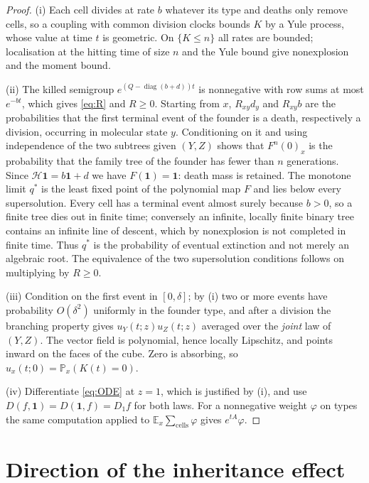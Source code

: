\documentclass[11pt]{article}
\theoremstyle{remark}
\newcommand{\one}{\mathbf 1}
\newcommand{\E}{\mathbb E}
\newcommand{\PP}{\mathbb P}
\newcommand{\diag}{\operatorname{diag}}
\newcommand{\Hm}{\mathcal H}
\begin{document}
\begin{proof}
(i) Each cell divides at rate $b$ whatever its type and deaths only remove
cells, so a coupling with common division clocks bounds $K$ by a Yule
process, whose value at time $t$ is geometric. On $\{K\le n\}$ all rates are
bounded; localisation at the hitting time of size $n$ and the Yule bound give
nonexplosion and the moment bound.

(ii) The killed semigroup $e^{(Q-\diag(b+d))t}$ is nonnegative with row sums
at most $e^{-bt}$, which gives \eqref{eq:R} and $R\ge0$. Starting from $x$,
$R_{xy}d_y$ and $R_{xy}b$ are the probabilities that the first terminal event
of the founder is a death, respectively a division, occurring in molecular
state $y$. Conditioning on it and using independence of the two subtrees
given $(Y,Z)$ shows that $F^n(0)_x$ is the probability that the family tree
of the founder has fewer than $n$ generations. Since $\Hm\one=b\one+d$ we have
$F(\one)=\one$: death mass is retained. The monotone limit $q^*$ is the least
fixed point of the polynomial map $F$ and lies below every supersolution.
Every cell has a terminal event almost surely because $b>0$, so a finite tree
dies out in finite time; conversely an infinite, locally finite binary tree
contains an infinite line of descent, which by nonexplosion is not completed
in finite time. Thus $q^*$ is the probability of eventual extinction and not
merely an algebraic root. The equivalence of the two supersolution conditions
follows on multiplying by $R\ge0$.

(iii) Condition on the first event in $[0,\delta]$; by (i) two or more events
have probability $O(\delta^2)$ uniformly in the founder type, and after a
division the branching property gives $u_Y(t;z)u_Z(t;z)$ averaged over the
\emph{joint} law of $(Y,Z)$. The vector field is polynomial, hence locally
Lipschitz, and points inward on the faces of the cube. Zero is absorbing, so
$u_x(t;0)=\PP_x(K(t)=0)$.

(iv) Differentiate \eqref{eq:ODE} at $z=1$, which is justified by (i), and
use $D(f,\one)=D(\one,f)=D_1f$ for both laws. For a nonnegative weight
$\varphi$ on types the same computation applied to
$\E_x\sum_{\text{cells}}\varphi$ gives $e^{tA}\varphi$.
\end{proof}

\section{Direction of the inheritance effect}\label{sec:direction}
\end{document}
